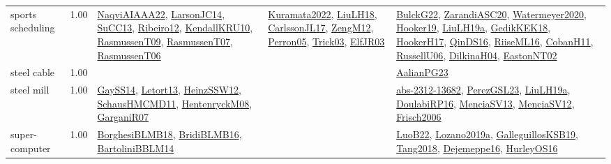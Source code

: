 {\begin{longtable}{p{3cm}r>{\raggedright\arraybackslash}p{6cm}>{\raggedright\arraybackslash}p{6cm}>{\raggedright\arraybackslash}p{8cm}}
\index{sports scheduling}\index{ApplicationAreas!sports scheduling}sports scheduling &  1.00 & \hyperref[detail:NaqviAIAAA22]{NaqviAIAAA22}, \hyperref[detail:LarsonJC14]{LarsonJC14}, \hyperref[detail:SuCC13]{SuCC13}, \hyperref[detail:Ribeiro12]{Ribeiro12}, \hyperref[detail:KendallKRU10]{KendallKRU10}, \hyperref[detail:RasmussenT09]{RasmussenT09}, \hyperref[detail:RasmussenT07]{RasmussenT07}, \hyperref[detail:RasmussenT06]{RasmussenT06} & \hyperref[detail:Kuramata2022]{Kuramata2022}, \hyperref[detail:LiuLH18]{LiuLH18}, \hyperref[detail:CarlssonJL17]{CarlssonJL17}, \hyperref[detail:ZengM12]{ZengM12}, \hyperref[detail:Perron05]{Perron05}, \hyperref[detail:Trick03]{Trick03}, \hyperref[detail:ElfJR03]{ElfJR03} & \hyperref[detail:BulckG22]{BulckG22}, \hyperref[detail:ZarandiASC20]{ZarandiASC20}, \hyperref[detail:Watermeyer2020]{Watermeyer2020}, \hyperref[detail:Hooker19]{Hooker19}, \hyperref[detail:LiuLH19a]{LiuLH19a}, \hyperref[detail:GedikKEK18]{GedikKEK18}, \hyperref[detail:HookerH17]{HookerH17}, \hyperref[detail:QinDS16]{QinDS16}, \hyperref[detail:RiiseML16]{RiiseML16}, \hyperref[detail:CobanH11]{CobanH11}, \hyperref[detail:RussellU06]{RussellU06}, \hyperref[detail:DilkinaH04]{DilkinaH04}, \hyperref[detail:EastonNT02]{EastonNT02}\\
\index{steel cable}\index{ApplicationAreas!steel cable}steel cable &  1.00 &  &  & \hyperref[detail:AalianPG23]{AalianPG23}\\
\index{steel mill}\index{ApplicationAreas!steel mill}steel mill &  1.00 & \hyperref[detail:GaySS14]{GaySS14}, \hyperref[detail:Letort13]{Letort13}, \hyperref[detail:HeinzSSW12]{HeinzSSW12}, \hyperref[detail:SchausHMCMD11]{SchausHMCMD11}, \hyperref[detail:HentenryckM08]{HentenryckM08}, \hyperref[detail:GarganiR07]{GarganiR07} &  & \hyperref[detail:abs-2312-13682]{abs-2312-13682}, \hyperref[detail:PerezGSL23]{PerezGSL23}, \hyperref[detail:LiuLH19a]{LiuLH19a}, \hyperref[detail:DoulabiRP16]{DoulabiRP16}, \hyperref[detail:MenciaSV13]{MenciaSV13}, \hyperref[detail:MenciaSV12]{MenciaSV12}, \hyperref[detail:Frisch2006]{Frisch2006}\\
\index{super-computer}\index{ApplicationAreas!super-computer}super-computer &  1.00 & \hyperref[detail:BorghesiBLMB18]{BorghesiBLMB18}, \hyperref[detail:BridiBLMB16]{BridiBLMB16}, \hyperref[detail:BartoliniBBLM14]{BartoliniBBLM14} &  & \hyperref[detail:LuoB22]{LuoB22}, \hyperref[detail:Lozano2019a]{Lozano2019a}, \hyperref[detail:GalleguillosKSB19]{GalleguillosKSB19}, \hyperref[detail:Tang2018]{Tang2018}, \hyperref[detail:Dejemeppe16]{Dejemeppe16}, \hyperref[detail:HurleyOS16]{HurleyOS16}\\

\end{longtable}}
